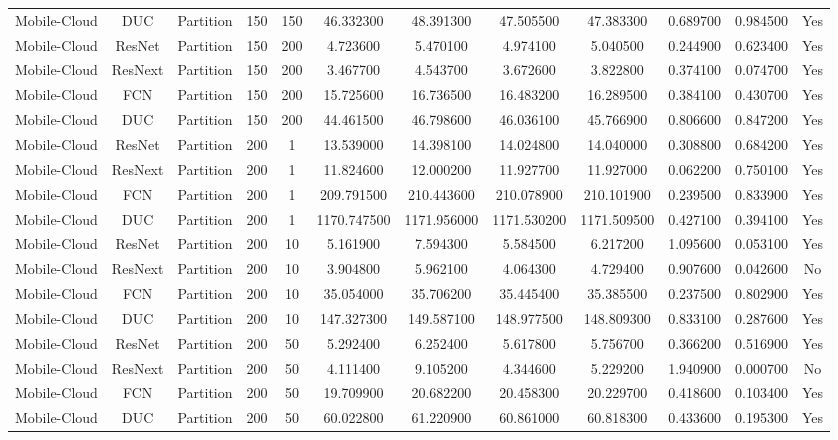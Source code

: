 \begin{tabular}{|c||c||c||c||c||c||c||c||c||c||c||c|}
Mobile-Cloud & DUC & Partition & 150 & 150 & 46.332300 & 48.391300 & 47.505500 & 47.383300 & 0.689700 & 0.984500 & Yes \\
Mobile-Cloud & ResNet & Partition & 150 & 200 & 4.723600 & 5.470100 & 4.974100 & 5.040500 & 0.244900 & 0.623400 & Yes \\
Mobile-Cloud & ResNext & Partition & 150 & 200 & 3.467700 & 4.543700 & 3.672600 & 3.822800 & 0.374100 & 0.074700 & Yes \\
Mobile-Cloud & FCN & Partition & 150 & 200 & 15.725600 & 16.736500 & 16.483200 & 16.289500 & 0.384100 & 0.430700 & Yes \\
Mobile-Cloud & DUC & Partition & 150 & 200 & 44.461500 & 46.798600 & 46.036100 & 45.766900 & 0.806600 & 0.847200 & Yes \\
Mobile-Cloud & ResNet & Partition & 200 & 1 & 13.539000 & 14.398100 & 14.024800 & 14.040000 & 0.308800 & 0.684200 & Yes \\
Mobile-Cloud & ResNext & Partition & 200 & 1 & 11.824600 & 12.000200 & 11.927700 & 11.927000 & 0.062200 & 0.750100 & Yes \\
Mobile-Cloud & FCN & Partition & 200 & 1 & 209.791500 & 210.443600 & 210.078900 & 210.101900 & 0.239500 & 0.833900 & Yes \\
Mobile-Cloud & DUC & Partition & 200 & 1 & 1170.747500 & 1171.956000 & 1171.530200 & 1171.509500 & 0.427100 & 0.394100 & Yes \\
Mobile-Cloud & ResNet & Partition & 200 & 10 & 5.161900 & 7.594300 & 5.584500 & 6.217200 & 1.095600 & 0.053100 & Yes \\
Mobile-Cloud & ResNext & Partition & 200 & 10 & 3.904800 & 5.962100 & 4.064300 & 4.729400 & 0.907600 & 0.042600 & No \\
Mobile-Cloud & FCN & Partition & 200 & 10 & 35.054000 & 35.706200 & 35.445400 & 35.385500 & 0.237500 & 0.802900 & Yes \\
Mobile-Cloud & DUC & Partition & 200 & 10 & 147.327300 & 149.587100 & 148.977500 & 148.809300 & 0.833100 & 0.287600 & Yes \\
Mobile-Cloud & ResNet & Partition & 200 & 50 & 5.292400 & 6.252400 & 5.617800 & 5.756700 & 0.366200 & 0.516900 & Yes \\
Mobile-Cloud & ResNext & Partition & 200 & 50 & 4.111400 & 9.105200 & 4.344600 & 5.229200 & 1.940900 & 0.000700 & No \\
Mobile-Cloud & FCN & Partition & 200 & 50 & 19.709900 & 20.682200 & 20.458300 & 20.229700 & 0.418600 & 0.103400 & Yes \\
Mobile-Cloud & DUC & Partition & 200 & 50 & 60.022800 & 61.220900 & 60.861000 & 60.818300 & 0.433600 & 0.195300 & Yes \\

\end{tabular}
